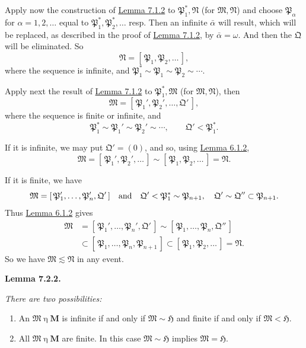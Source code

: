 \documentclass[12pt,b5paper,twoside]{article}
\newcommand{\Hspace}{\mathfrak H}
\newcommand{\M}{\mathbf M}
\newcommand{\clos}[1]{[\,#1\,]}
\newcommand{\Lemma}[1]{%
  \par\smallskip\noindent\phantomsection\label{lem:#1}\textbf{Lemma #1.}\enspace
}
\newcommand{\lemref}[1]{\hyperref[lem:#1]{Lemma #1}}
\begin{document}
Apply now the construction of \lemref{7.1.2} to
\(\mathfrak P_1^*,\mathfrak N\) (for \(\mathfrak M,\mathfrak N\)) and
choose \(\mathfrak P_\alpha\) for \(\alpha=1,2,\ldots\) equal to
\(\mathfrak P_1^*,\mathfrak P_2^*,\ldots\) resp. Then an infinite
\(\bar\alpha\) will result, which will be replaced, as described in the proof
of \lemref{7.1.2}, by \(\bar\alpha=\omega\). And then the \(\mathfrak Q\)
will be eliminated. So
\[
 \mathfrak N=\clos{\mathfrak P_1,\mathfrak P_2,\ldots},
\]
where the sequence is infinite, and
\(\mathfrak P_1^*\sim\mathfrak P_1\sim\mathfrak P_2\sim\cdots\).

Apply next the result of \lemref{7.1.2} to
\(\mathfrak P_1^*,\mathfrak M\) (for \(\mathfrak M,\mathfrak N\)), then
\[
 \mathfrak M=\clos{\mathfrak P_1',\mathfrak P_2',\ldots,\mathfrak Q'},
\]
where the sequence is finite or infinite, and
\[
 \mathfrak P_1^*\sim\mathfrak P_1'\sim\mathfrak P_2'\sim\cdots,
 \qquad \mathfrak Q'<\mathfrak P_1^*.
\]

If it is infinite, we may put \(\mathfrak Q'=(0)\), and so, using
\lemref{6.1.2},
\[
 \mathfrak M=\clos{\mathfrak P_1',\mathfrak P_2',\ldots}
 \sim\clos{\mathfrak P_1,\mathfrak P_2,\ldots}=\mathfrak N.
\]

If it is finite, we have
\[
 \mathfrak M=\clos{\mathfrak P_1',\ldots,\mathfrak P_n',\mathfrak Q'}
 \quad\hbox{and}\quad
 \mathfrak Q'<\mathfrak P_1^*\sim\mathfrak P_{n+1},
 \quad
 \mathfrak Q'\sim\mathfrak Q''\subset\mathfrak P_{n+1}.
\]
Thus \lemref{6.1.2} gives
\begin{align*}
 \mathfrak M
 &=\clos{\mathfrak P_1',\ldots,\mathfrak P_n',\mathfrak Q'}
 \sim\clos{\mathfrak P_1,\ldots,\mathfrak P_n,\mathfrak Q''}\\
 &\subset\clos{\mathfrak P_1,\ldots,\mathfrak P_n,\mathfrak P_{n+1}}
 \subset\clos{\mathfrak P_1,\mathfrak P_2,\ldots}=\mathfrak N.
\end{align*}
So we have \(\mathfrak M\lesssim\mathfrak N\) in any event.

\Lemma{7.2.2} {\itshape
There are two possibilities:
\begin{enumerate}[label=(\alph*)]
 \item An \(\mathfrak M\mathbin{\eta}\M\) is infinite if and only if
   \(\mathfrak M\sim\Hspace\) and finite if and only if
   \(\mathfrak M<\Hspace\).
 \item All \(\mathfrak M\mathbin{\eta}\M\) are finite. In this case
   \(\mathfrak M\sim\Hspace\) implies \(\mathfrak M=\Hspace\).
\end{enumerate}
}
\end{document}
